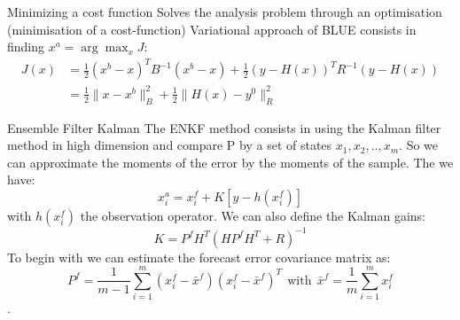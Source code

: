 \begin{frame}{Minimizing a cost function}
    Solves the analysis problem through an optimisation (minimisation of a cost-function)
    Variational approach of BLUE consists in finding $x^a=\arg\max_{x}J$:
    $$\begin{aligned}
        J(x)&=\frac{1}{2}(x^b-x)^TB^{-1}(x^b-x)+\frac{1}{2}(y-H(x))^TR^{-1}(y-H(x)) \\
        &=\frac{1}{2}\|x-x^b\|_B^2+\frac{1}{2}\|H(x)-y^0\|_R^2
    \end{aligned}$$
	\begin{minipage}{\linewidth}
		\centering
	\end{minipage}
\end{frame}
\begin{frame}{Ensemble Filter Kalman}
    The ENKF method consists in using the Kalman filter method in high dimension and compare P by a set of states $x_1,x_2,..,x_{m}$. So we can approximate the moments of the error by the moments of the sample.
    The we have:
    $$x_i^a=x_i^f+K[y-h(x_i^f)]$$
    with $h(x_i^f)$ the observation operator.
    We can also define the Kalman gains: 
    $$K=P^f H^T(HP^f H^T+R)^{-1}$$
    To begin with we can estimate the
    forecast error covariance matrix as:
    $$P^f=\frac{1}{m-1}\sum_{i=1}^{m}(x_i^f-\bar{x}^f)(x_i^f-\bar{x}^f)^T~~\text{with}~~\bar{x}^f=\frac{1}{m}\sum_{i=1}^{m}x_i^f $$ .
\end{frame}
